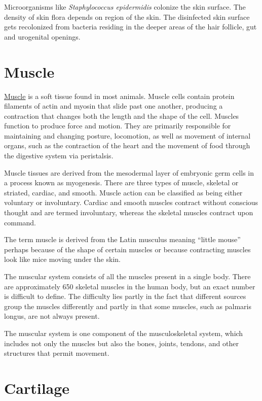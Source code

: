Microorganisms like \emph{Staphylococcus epidermidis} colonize the skin
surface. The density of skin flora depends on region of the skin. The
disinfected skin surface gets recolonized from bacteria residing in the
deeper areas of the hair follicle, gut and urogenital openings.

\section{Muscle}\label{muscle}

\href{https://en.wikipedia.org/wiki/Muscle}{Muscle} is a soft tissue
found in most animals. Muscle cells contain protein filaments of actin
and myosin that slide past one another, producing a contraction that
changes both the length and the shape of the cell. Muscles function to
produce force and motion. They are primarily responsible for maintaining
and changing posture, locomotion, as well as movement of internal
organs, such as the contraction of the heart and the movement of food
through the digestive system via peristalsis.

Muscle tissues are derived from the mesodermal layer of embryonic germ
cells in a process known as myogenesis. There are three types of muscle,
skeletal or striated, cardiac, and smooth. Muscle action can be
classified as being either voluntary or involuntary. Cardiac and smooth
muscles contract without conscious thought and are termed involuntary,
whereas the skeletal muscles contract upon command.

The term muscle is derived from the Latin musculus meaning ``little
mouse'' perhaps because of the shape of certain muscles or because
contracting muscles look like mice moving under the skin.

The muscular system consists of all the muscles present in a single
body. There are approximately 650 skeletal muscles in the human body,
but an exact number is difficult to define. The difficulty lies partly
in the fact that different sources group the muscles differently and
partly in that some muscles, such as palmaris longus, are not always
present.

The muscular system is one component of the musculoskeletal system,
which includes not only the muscles but also the bones, joints, tendons,
and other structures that permit movement.

\section{Cartilage}\label{cartilage}

